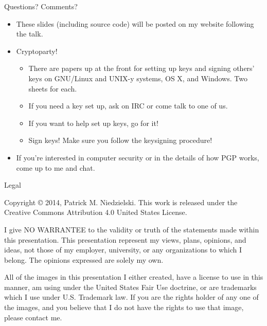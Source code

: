 \documentclass{beamer}
\begin{document}
\begin{frame}{Questions?  Comments?}
  \begin{itemize}
  \item These slides (including source code) will be posted on my
    website following the talk.
  \item Cryptoparty!
    \begin{itemize}
    \item There are papers up at the front for setting up keys and
      signing others' keys on GNU/Linux and UNIX-y systems, OS X, and
      Windows.  Two sheets for each.
    \item If you need a key set up, ask on IRC or come talk to one of
      us.
    \item If you want to help set up keys, go for it!
    \item Sign keys!  Make sure you follow the keysigning procedure!
    \end{itemize}
  \item If you're interested in computer security or in the details of
    how PGP works, come up to me and chat.
  \end{itemize}
\end{frame}

\begin{frame}{Legal}
  \centerline{\ccby}
  \begin{center}
    Copyright \copyright{} 2014, Patrick M. Niedzielski. This work is
    released under the Creative Commons Attribution 4.0 United States
    License.
  \end{center}

  I give NO WARRANTEE to the validity or truth of the statements made
  within this presentation.  This presentation represent my views,
  plans, opinions, and ideas, not those of my employer, university, or
  any organizations to which I belong. The opinions expressed are
  solely my own.

  \medspace\medspace\medspace

  All of the images in this presentation I either created, have a
  license to use in this manner, am using under the United States Fair
  Use doctrine, or are trademarks which I use under U.S. Trademark
  law.  If you are the rights holder of any one of the images, and you
  believe that I do not have the rights to use that image, please
  contact me.
\end{frame}
\end{document}
